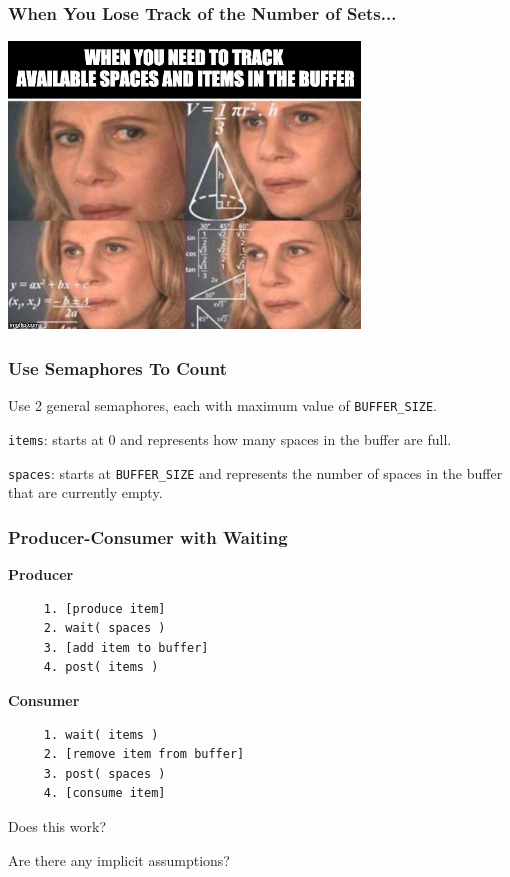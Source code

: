 \begin{frame}
\frametitle{When You Lose Track of the Number of Sets...}

\begin{center}
	\includegraphics[width=0.7\textwidth]{images/counting.jpeg}
\end{center}

\end{frame}


\begin{frame}
\frametitle{Use Semaphores To Count}

Use 2 general semaphores, each with maximum value of \texttt{BUFFER\_SIZE}. 

\texttt{items}: starts at 0 and represents how many spaces in the buffer are full. 

\texttt{spaces}: starts at \texttt{BUFFER\_SIZE} and represents the number of spaces in the buffer that are currently empty.

\end{frame}


\begin{frame}[fragile]
\frametitle{Producer-Consumer with Waiting}

\begin{multicols}{2}
\textbf{Producer}
  \begin{verbatim}
	 1. [produce item]
	 2. wait( spaces )
	 3. [add item to buffer]
	 4. post( items )
  \end{verbatim}
\columnbreak
\textbf{Consumer}
  \begin{verbatim}
	 1. wait( items )
	 2. [remove item from buffer]
	 3. post( spaces )
	 4. [consume item]
  \end{verbatim}
\end{multicols}
\vspace{-2em}

Does this work?

Are there any implicit assumptions?

\end{frame}

